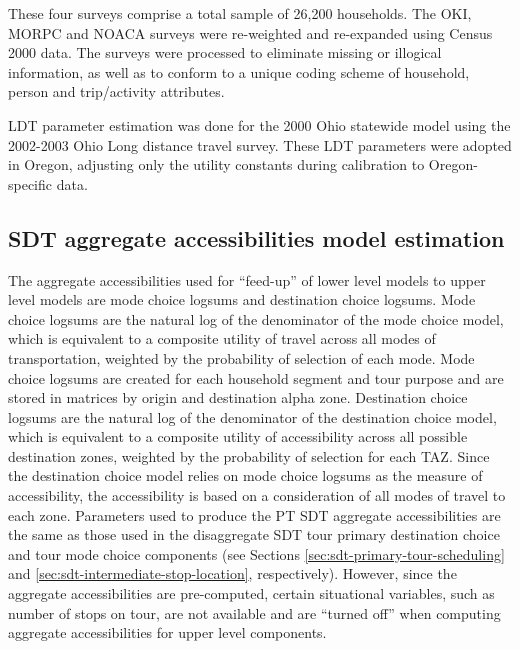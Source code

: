 \noindent These four surveys comprise a total sample of 26,200 households. The OKI, MORPC and NOACA surveys were re-weighted and re-expanded using Census 2000 data. The surveys were processed to eliminate missing or illogical information, as well as to conform to a unique coding scheme of household, person and trip/activity attributes.

LDT parameter estimation was done for the 2000 Ohio statewide model using the 2002-2003 Ohio Long distance travel survey. These LDT parameters were adopted in Oregon, adjusting only the utility constants during calibration to Oregon-specific data.

\subsection{SDT aggregate accessibilities model estimation}
The aggregate accessibilities used for ``feed-up'' of lower level models to upper level models are mode choice logsums and destination choice logsums. Mode choice logsums are the natural log of the denominator of the mode choice model, which is equivalent to a composite utility of travel across all modes of transportation, weighted by the probability of selection of each mode. Mode choice logsums are created for each household segment and tour purpose and are stored in matrices by origin and destination alpha zone. Destination choice logsums are the natural log of the denominator of the destination choice model, which is equivalent to a composite utility of accessibility across all possible destination zones, weighted by the probability of selection for each TAZ. Since the destination choice model relies on mode choice logsums as the measure of accessibility, the accessibility is based on a consideration of all modes of travel to each zone. Parameters used to produce the PT SDT aggregate accessibilities are the same as those used in the disaggregate SDT tour primary destination choice and tour mode choice components (see Sections \ref{sec:sdt-primary-tour-scheduling} and \ref{sec:sdt-intermediate-stop-location}, respectively). However, since the aggregate accessibilities are pre-computed, certain situational variables, such as number of stops on tour, are not available and are ``turned off'' when computing aggregate accessibilities for upper level components.

